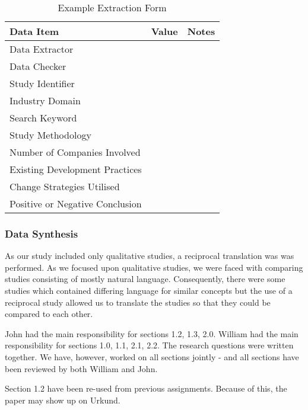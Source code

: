\documentclass[10pt,twocolumn]{article}
\begin{document}
\begin{table}[ht]
	\centering
	\begin{tabular}{|l|l|l|} 
		\hline
		\textbf{Data Item} & \textbf{Value} & \textbf{Notes}  \\
		\hline
		Data Extractor &  &  \\
		\hline
		Data Checker &  & \\
		\hline
		Study Identifier &  & \\
		\hline
		Industry Domain & & \\
		\hline
		Search Keyword &  & \\
		\hline
		Study Methodology & & \\
		\hline
		Number of Companies Involved &  & \\
		\hline
		Existing Development Practices & & \\
		\hline
		Change Strategies Utilised & & \\
		\hline
		Positive or Negative Conclusion & & \\
		\hline
	\end{tabular}
	\caption{Example Extraction Form}
\end{table}

\subsubsection{Data Synthesis}

As our study included only qualitative studies, a reciprocal translation was was performed. As we focused upon qualitative studies, we were faced with comparing studies consisting of mostly natural language. Consequently, there were some studies which contained differing language for similar concepts but the use of a reciprocal study allowed us to translate the studies so that they could be compared to each other.  





John had the main responsibility for sections 1.2, 1.3, 2.0. William had the main responsibility for sections 1.0, 1.1, 2.1, 2.2. The research questions were written together. We have, however, worked on all sections jointly - and all sections have been reviewed by both William and John. 

Section 1.2 have been re-used from previous assignments. Because of this, the paper may show up on Urkund. 
\end{document}
